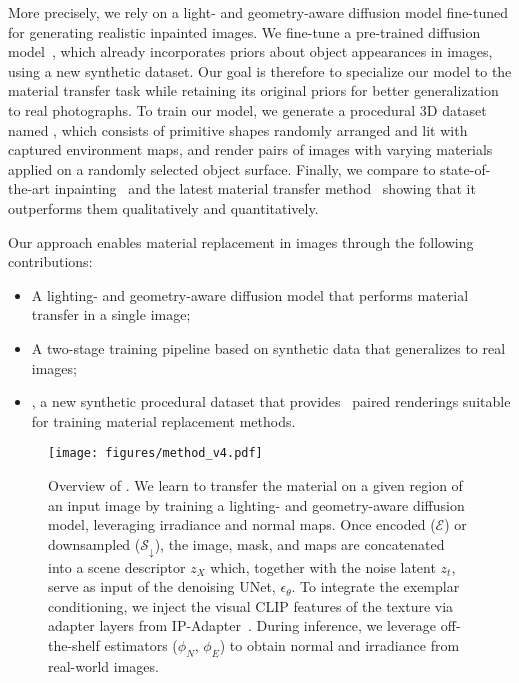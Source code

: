 More precisely, we rely on a light- and geometry-aware diffusion model fine-tuned for generating realistic inpainted images. We fine-tune a pre-trained diffusion model~\cite{rombach2021highresolution}, which already incorporates priors about object appearances in images, using a new synthetic dataset. Our goal is therefore to specialize our model to the material transfer task while retaining its original priors for better generalization to real photographs. 
To train our model, we generate a procedural 3D dataset named \datasetname{}, which consists of primitive shapes randomly arranged and lit with captured environment maps, and render pairs of images with varying materials applied on a randomly selected object surface.
Finally, we compare \method{} to state-of-the-art inpainting~\cite{rombach2021highresolution,podell2023sdxl,flux.1,avrahami2023blended} and the latest material transfer method~\cite{cheng2024zest} showing that it outperforms them qualitatively and quantitatively. 

Our approach enables material replacement in images through the following contributions:
\begin{itemize}
    \item A lighting- and geometry-aware diffusion model that performs material transfer in a single image;
    \item A two-stage training pipeline based on synthetic data that generalizes to real images;
    \item \datasetname{}, a new synthetic procedural dataset that provides \nbtotal~paired renderings suitable for training material replacement methods.
\end{itemize}


\begin{figure*}[t]
  \texttt{[image: figures/method\_v4.pdf]}
  \caption{Overview of \method{}.
  We learn to transfer the material \exemplar on a given region \mask of an input image \target by training a lighting- and geometry-aware diffusion model, leveraging irradiance \irra and normal \normal maps. Once encoded ($\mathcal{E}$) or downsampled ($\mathcal{S}_\downarrow$), the image, mask, and maps are concatenated into a scene descriptor $z_X$ which, together with the noise latent $z_t$, serve as input of the denoising UNet, $\epsilon_{\theta}$. To integrate the exemplar conditioning, we inject the visual CLIP features of the texture via adapter layers from IP-Adapter~\cite{ye2023ipadapter}. 
  During inference, we leverage off-the-shelf estimators ($\phi_N$, $\phi_E$) to obtain normal and irradiance from real-world images. 
  }
  \label{fig:method}
\end{figure*}
